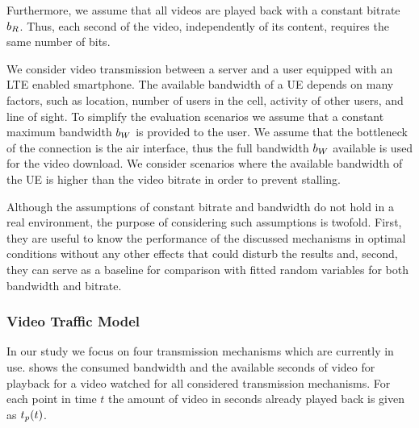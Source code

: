 Furthermore, we assume that all videos are played back with a constant bitrate \(b_R\).
Thus, each second of the video, independently of its content, requires the same number of bits.

We consider video transmission between a server and a user equipped with an \gls{LTE} enabled smartphone.
The available bandwidth of a \gls{UE} depends on many factors, such as location, number of users in the cell, activity of other users, and line of sight.
To simplify the evaluation scenarios we assume that a constant maximum bandwidth \(b_W\) is provided to the user.
We assume that the bottleneck of the connection is the air interface, thus the full bandwidth \(b_W\) available is used for the video download.
We consider scenarios where the available bandwidth of the \gls{UE} is higher than the video bitrate in order to prevent stalling.

Although the assumptions of constant bitrate and bandwidth do not hold in a real environment, the purpose of considering such assumptions is twofold. First, they are useful to know the performance of the discussed mechanisms in optimal conditions without any other effects that could disturb the results and, second, they can serve as a baseline for comparison with fitted random variables for both bandwidth and bitrate.

\subsubsection*{Video Traffic Model}\label{sec:application:lte_video:system_model:video_traffic}

In our study we focus on four transmission mechanisms which are currently in use.
 shows the consumed bandwidth and the available seconds of video for playback for a video watched for all considered transmission mechanisms.
For each point in time \(t\) the amount of video in seconds already played back is given as \(t_p(t)\).

